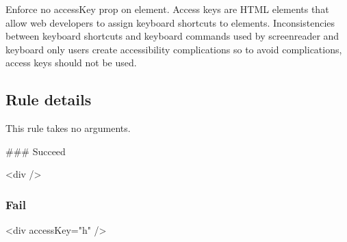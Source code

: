 Enforce no access\+Key prop on element. Access keys are H\+T\+ML elements that allow web developers to assign keyboard shortcuts to elements. Inconsistencies between keyboard shortcuts and keyboard commands used by screenreader and keyboard only users create accessibility complications so to avoid complications, access keys should not be used.

\subsection*{Rule details}

This rule takes no arguments.

\#\#\# Succeed 
\begin{DoxyCode}
<div />
\end{DoxyCode}


\subsubsection*{Fail}


\begin{DoxyCode}
<div accessKey="h" />
\end{DoxyCode}
 